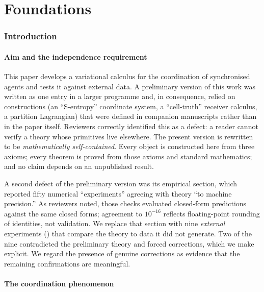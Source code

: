 \documentclass[11pt,twocolumn,a4paper]{article}
\begin{document}
\tableofcontents


\part{Foundations}

\section{Introduction}
\label{sec:intro}

\subsection{Aim and the independence requirement}

This paper develops a variational calculus for the coordination of
synchronised agents and tests it against external data. A preliminary version
of this work was written as one entry in a larger programme and, in
consequence, relied on constructions (an ``S-entropy'' coordinate system, a
``cell-truth'' receiver calculus, a partition Lagrangian) that were defined in
companion manuscripts rather than in the paper itself. Reviewers correctly
identified this as a defect: a reader cannot verify a theory whose primitives
live elsewhere. The present version is rewritten to be \emph{mathematically
self-contained}. Every object is constructed here from three axioms; every
theorem is proved from those axioms and standard mathematics; and no claim
depends on an unpublished result.

A second defect of the preliminary version was its empirical section, which
reported fifty numerical ``experiments'' agreeing with theory ``to machine
precision.'' As reviewers noted, those checks evaluated closed-form predictions
against the same closed forms; agreement to $10^{-16}$ reflects floating-point
rounding of identities, not validation. We replace that section with nine
\emph{external} experiments () that compare the theory to
data it did not generate. Two of the nine contradicted the preliminary theory
and forced corrections, which we make explicit. We regard the presence of
genuine corrections as evidence that the remaining confirmations are
meaningful.

\subsection{The coordination phenomenon}
\end{document}
